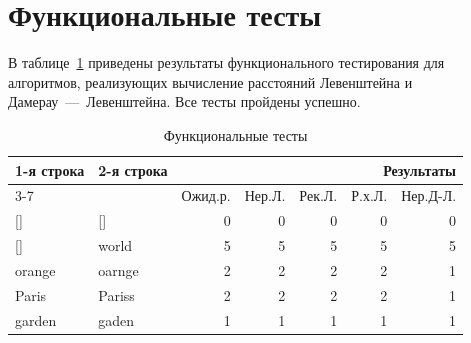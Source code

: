 \documentclass[a4paper, 12pt]{extreport}
\begin{document}
\section{Функциональные тесты}
В таблице~\ref{tbl:functional_test} приведены результаты функционального тестирования для алгоритмов, реализующих вычисление расстояний Левенштейна и Дамерау~---~Левенштейна. Все тесты пройдены успешно.
\begin{table}[h]
    \begin{center}
    \begin{threeparttable}
        \captionsetup{justification=raggedright,singlelinecheck=off}
        \caption{\label{tbl:functional_test} Функциональные тесты}
        \begin{tabular}{|l|l|rrrrr|}
            \hline
            \multirow{2}{*}{1-я строка} & \multirow{2}{*}{2-я строка} & \multicolumn{5}{r|}{Результаты}                                                                                                       \\ \cline{3-7} 
                                        &                             & \multicolumn{1}{r|}{Ожид.р.} & \multicolumn{1}{r|}{Нер.Л.} & \multicolumn{1}{r|}{Рек.Л.} & \multicolumn{1}{r|}{Р.х.Л.} & Нер.Д-Л. \\ \hline
            {[}{]}                      & {[}{]}                      & \multicolumn{1}{r|}{0}      & \multicolumn{1}{r|}{0}       & \multicolumn{1}{r|}{0}       & \multicolumn{1}{r|}{0}            & 0     \\ \hline
            {[}{]}                      & world                       & \multicolumn{1}{r|}{5}      & \multicolumn{1}{r|}{5}       & \multicolumn{1}{r|}{5}       & \multicolumn{1}{r|}{5}            & 5     \\ \hline
            orange                      & oarnge                      & \multicolumn{1}{r|}{2}      & \multicolumn{1}{r|}{2}       & \multicolumn{1}{r|}{2}       & \multicolumn{1}{r|}{2}            & 1     \\ \hline
            Paris                       & Pariss                      & \multicolumn{1}{r|}{2}   & \multicolumn{1}{r|}{2}       & \multicolumn{1}{r|}{2}       & \multicolumn{1}{r|}{2}            & 1     \\ \hline
            garden                      & gaden                       & \multicolumn{1}{r|}{1}      & \multicolumn{1}{r|}{1}       & \multicolumn{1}{r|}{1}       & \multicolumn{1}{r|}{1}            & 1     \\ \hline

\end{tabular}
\end{threeparttable}
\end{center}
\end{table}
\end{document}
